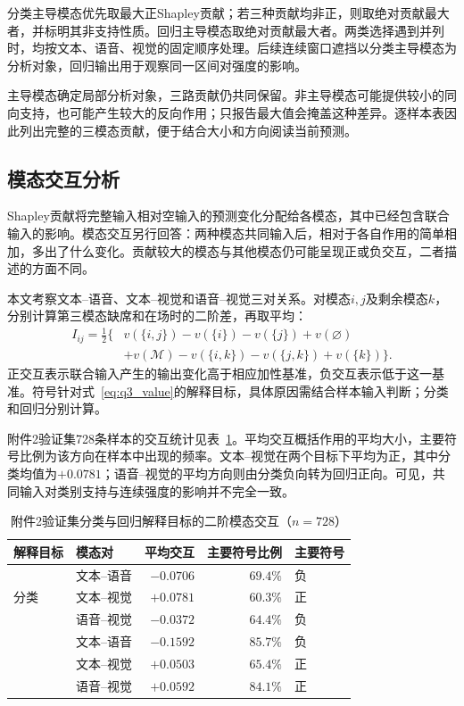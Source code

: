 \QThreeParagraph 分类主导模态优先取最大正Shapley贡献；若三种贡献均非正，则取绝对贡献最大者，并标明其非支持性质。回归主导模态取绝对贡献最大者。两类选择遇到并列时，均按文本、语音、视觉的固定顺序处理。后续连续窗口遮挡以分类主导模态为分析对象，回归输出用于观察同一区间对强度的影响。

\QThreeParagraph 主导模态确定局部分析对象，三路贡献仍共同保留。非主导模态可能提供较小的同向支持，也可能产生较大的反向作用；只报告最大值会掩盖这种差异。逐样本表因此列出完整的三模态贡献，便于结合大小和方向阅读当前预测。

\subsection{模态交互分析}\label{subsec:q3_interaction}
Shapley贡献将完整输入相对空输入的预测变化分配给各模态，其中已经包含联合输入的影响。模态交互另行回答：两种模态共同输入后，相对于各自作用的简单相加，多出了什么变化。贡献较大的模态与其他模态仍可能呈现正或负交互，二者描述的方面不同。

\QThreeParagraph 本文考察文本--语音、文本--视觉和语音--视觉三对关系。对模态$i,j$及剩余模态$k$，分别计算第三模态缺席和在场时的二阶差，再取平均：
\begin{equation}
\begin{aligned}
I_{ij}=\tfrac12\{&
v(\{i,j\})-v(\{i\})-v(\{j\})+v(\varnothing)\\
&+v(\mathcal M)-v(\{i,k\})-v(\{j,k\})+v(\{k\})\}.
\end{aligned}
\label{eq:q3_interaction}
\end{equation}
\QThreeParagraph 正交互表示联合输入产生的输出变化高于相应加性基准，负交互表示低于这一基准。符号针对式~\eqref{eq:q3_value}的解释目标，具体原因需结合样本输入判断；分类和回归分别计算。

\QThreeParagraph 附件2验证集728条样本的交互统计见表~\ref{tab:q3_interaction}。平均交互概括作用的平均大小，主要符号比例为该方向在样本中出现的频率。文本--视觉在两个目标下平均为正，其中分类均值为$+0.0781$；语音--视觉的平均方向则由分类负向转为回归正向。可见，共同输入对类别支持与连续强度的影响并不完全一致。

\begin{table}[H]
\centering{}
\caption{附件2验证集分类与回归解释目标的二阶模态交互（$n=728$）}
\label{tab:q3_interaction}
\begin{tabular}{@{}llrrl@{}}
\toprule
解释目标 & 模态对 & 平均交互 & 主要符号比例 & 主要符号\\
\midrule
\multirow{3}{*}{分类} & 文本--语音 & $-0.0706$ & $69.4\%$ & 负\\
 & 文本--视觉 & $+0.0781$ & $60.3\%$ & 正\\
 & 语音--视觉 & $-0.0372$ & $64.4\%$ & 负\\
\addlinespace
\multirow{3}{*}{回归} & 文本--语音 & $-0.1592$ & $85.7\%$ & 负\\
 & 文本--视觉 & $+0.0503$ & $65.4\%$ & 正\\
 & 语音--视觉 & $+0.0592$ & $84.1\%$ & 正\\
\bottomrule
\end{tabular}
\end{table}

